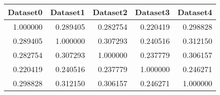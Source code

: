 \begin{tabular}{rrrrr}
\toprule
 Dataset0 &  Dataset1 &  Dataset2 &  Dataset3 &  Dataset4 \\
\midrule
 1.000000 &  0.289405 &  0.282754 &  0.220419 &  0.298828 \\
 0.289405 &  1.000000 &  0.307293 &  0.240516 &  0.312150 \\
 0.282754 &  0.307293 &  1.000000 &  0.237779 &  0.306157 \\
 0.220419 &  0.240516 &  0.237779 &  1.000000 &  0.246271 \\
 0.298828 &  0.312150 &  0.306157 &  0.246271 &  1.000000 \\
\bottomrule
\end{tabular}
